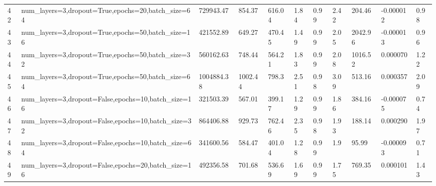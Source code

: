 \begin{longtable}{C{0.8cm} L{2cm} C{1.15cm} C{1.15cm} C{1.15cm} C{1.15cm} C{0.85cm} C{1.25cm} C{1.2cm} C{1.5cm} C{1.0cm}}
42 & num\_layers=3,\newline dropout=True,\newline epochs=20,\newline batch\_size=64 & 729943.47 & 854.37 & 616.04 & 1.84 & 0.99 & 2.42 & 204.46 & -0.000012 & 0.98 \\
43 & num\_layers=3,\newline dropout=True,\newline epochs=50,\newline batch\_size=16 & 421552.89 & 649.27 & 470.45 & 1.49 & 0.99 & 2.05 & 2042.96 & -0.000013 & 0.96 \\
44 & num\_layers=3,\newline dropout=True,\newline epochs=50,\newline batch\_size=32 & 560162.63 & 748.44 & 564.21 & 1.83 & 0.99 & 2.08 & 1016.52 & 0.000070 & 1.22 \\
45 & num\_layers=3,\newline dropout=True,\newline epochs=50,\newline batch\_size=64 & 1004884.38 & 1002.44 & 798.3 & 2.51 & 0.98 & 3.09 & 513.16 & 0.000357 & 2.09 \\
46 & num\_layers=3,\newline dropout=False,\newline epochs=10,\newline batch\_size=16 & 321503.39 & 567.01 & 399.17 & 1.29 & 0.99 & 1.86 & 384.16 & -0.000075 & 0.74 \\
47 & num\_layers=3,\newline dropout=False,\newline epochs=10,\newline batch\_size=32 & 864406.88 & 929.73 & 762.46 & 2.35 & 0.98 & 1.93 & 188.14 & 0.000290 & 1.97 \\
48 & num\_layers=3,\newline dropout=False,\newline epochs=10,\newline batch\_size=64 & 341600.56 & 584.47 & 401.04 & 1.28 & 0.99 & 1.9 & 95.99 & -0.000093 & 0.71 \\
49 & num\_layers=3,\newline dropout=False,\newline epochs=20,\newline batch\_size=16 & 492356.58 & 701.68 & 536.69 & 1.69 & 0.99 & 1.75 & 769.35 & 0.000101 & 1.43 \\

\end{longtable}
